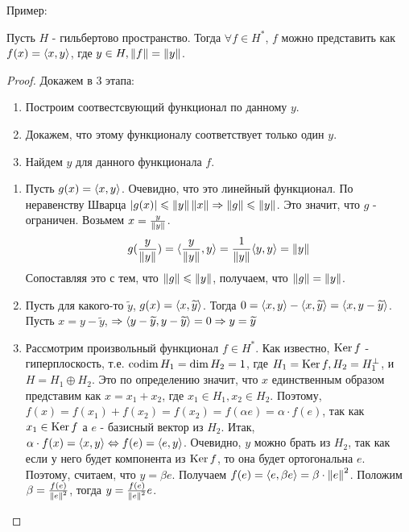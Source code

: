 Пример: \todo

\begin{theorem}
	Пусть $H$ - гильбертово пространство. Тогда $\forall f \in H^*$, $f$ можно представить как $f(x) = \langle x , y\rangle$, где $y \in H, \left\|f\right\| = \left\|y\right\|$.
\end{theorem}
\begin{proof}
	Докажем в 3 этапа:
	\begin{enumerate}
		\item Построим соотвестсвующий функционал по данному $y$.
		\item Докажем, что этому функционалу соответствует только один $y$.
		\item Найдем $y$ для данного функционала $f$.
	\end{enumerate}
	\begin{enumerate}[leftmargin=*]
	\item
	Пусть $g(x) = \langle x , y\rangle$. Очевидно, что это линейный функционал. 
	По неравенству Шварца $\left|g(x)\right| \leqslant \left\|y\right\| \left\|x\right\| \Rightarrow \left\|g\right\| \leqslant \left\|y\right\|$. Это значит, что $g$ - ограничен.
	Возьмем $x = \frac{y}{\left\|y\right\|}$. 
	\begin{gather*}
		g(\frac{y}{\left\|y\right\|}) = \langle \frac{y}{\left\|y\right\|} , y\rangle = \frac{1}{\left\|y\right\|}\langle y , y\rangle = \left\|y\right\|
	\end{gather*}
	Сопоставляя это с тем, что $\left\|g\right\| \leqslant \left\|y\right\|$, получаем, что $\left\|g\right\| = \left\|y\right\|$.
	\item
	Пусть для какого-то $\widetilde{y}$, $g(x) = \langle x , \widetilde{y}\rangle$.
	Тогда $0 = \langle x , y\rangle - \langle x , \widetilde{y}\rangle = \langle x , y - \widetilde{y}\rangle$. Пусть $x = y - \widetilde{y}$,  
	$\Rightarrow \langle y - \widetilde{y} , y - \widetilde{y}\rangle = 0 \Rightarrow y = \widetilde{y}$
	\item
	Рассмотрим произвольный функционал $f \in H^*$. Как известно, $\operatorname{Ker} f$ - гиперплоскость, т.е. 
	$\operatorname{codim} H_1 = \dim H_2 = 1$, где $H_1 = \operatorname{Ker} f, H_2 = H_1^\bot$, и $H = H_1 \oplus H_2$.
	Это по определению значит, что $x$ единственным образом представим как $x = x_1 + x_2$, где $x_1 \in H_1, x_2 \in H_2$.
	Поэтому, $f(x) = f(x_1) + f(x_2) = f(x_2) = f(\alpha e) = \alpha \cdot f(e)$, так как $x_1 \in \operatorname{Ker} f$ а $e$ - базисный вектор из $H_2$.
	Итак, $\alpha \cdot f(x) = \langle x , y\rangle \Leftrightarrow f(e) = \langle e , y\rangle$. 
	Очевидно, $y$ можно брать из $H_2$, так как если у него будет компонента из $\operatorname{Ker} f$, то она будет ортогональна $e$. 
	Поэтому, считаем, что $y = \beta e$.
	Получаем $f(e) = \langle e , \beta e\rangle = \beta \cdot \left\|e\right\|^2$. Положим $\beta = \frac{f(e)}{\left\|e\right\|^2}$, тогда $y = \frac{f(e)}{\left\|e\right\|^2}e$.
	\end{enumerate}
\end{proof}


